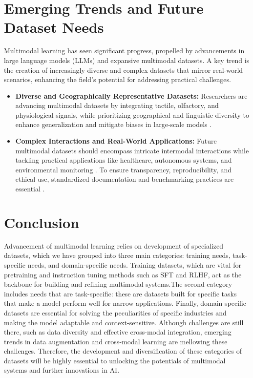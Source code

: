 \documentclass[runningheads]{llncs}
\begin{document}
\section{Emerging Trends and Future Dataset Needs}

Multimodal learning has seen significant progress, propelled by advancements in large language models (LLMs) and expansive multimodal datasets. A key trend is the creation of increasingly diverse and complex datasets that mirror real-world scenarios, enhancing the field's potential for addressing practical challenges.

\begin{itemize}
    \item 
    \textbf{Diverse and Geographically Representative Datasets:}
Researchers are advancing multimodal datasets by integrating tactile, olfactory, and physiological signals, while prioritizing geographical and linguistic diversity to enhance generalization and mitigate biases in large-scale models \cite{ref16}.
    \item 
    \textbf{Complex Interactions and Real-World Applications:}
Future multimodal datasets should encompass intricate intermodal interactions while tackling practical applications like healthcare, autonomous systems, and environmental monitoring \cite{ref59}. To ensure transparency, reproducibility, and ethical use, standardized documentation and benchmarking practices are essential \cite{ref63}.
\end{itemize}

\section{Conclusion}
Advancement of multimodal learning relies on development of specialized datasets, which we have grouped into three main categories: training needs, task-specific needs, and domain-specific needs. Training datasets, which are vital for pretraining and instruction tuning methods such as SFT and RLHF, act as the backbone for building and refining multimodal systems.The second category includes needs that are task-specific: these are datasets built for specific tasks that make a model perform well for narrow applications. Finally, domain-specific datasets are essential for solving the peculiarities of specific industries and making the model adaptable and context-sensitive. Although challenges are still there, such as data diversity and effective cross-modal integration, emerging trends in data augmentation and cross-modal learning are mellowing these challenges. Therefore, the development and diversification of these categories of datasets will be highly essential to unlocking the potentials of multimodal systems and further innovations in AI.
%
%
%
 
 
%
\end{document}
